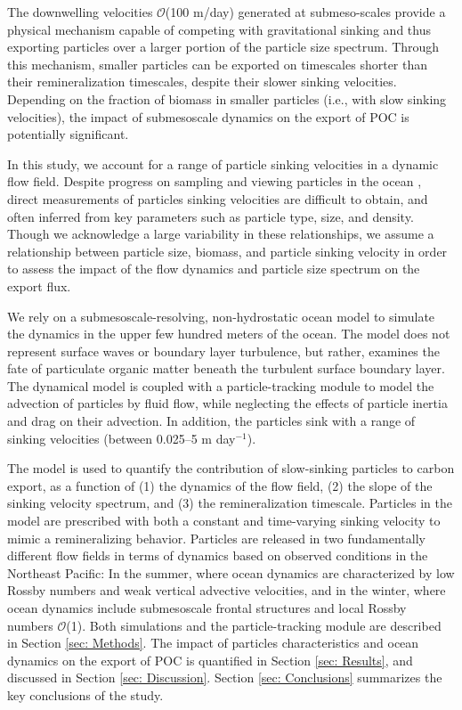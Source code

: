 \documentclass[article,linenumbers]{agujournal2018}
\begin{document}
	The downwelling velocities $\mathcal{O}$(100 m/day) generated at submeso-scales provide a physical mechanism capable of competing with gravitational sinking and thus exporting particles over a larger portion of the particle size spectrum. Through this mechanism, smaller particles can be exported on timescales shorter than their remineralization timescales, despite their slower sinking velocities.   Depending on the fraction of  biomass in smaller particles (i.e., with slow sinking velocities), the impact of submesoscale dynamics on the export of POC is potentially significant.
	
	In this study, we account for a range of particle sinking velocities in a dynamic flow field. Despite progress on sampling and viewing particles in the ocean \citep{McDonnell_2010}, direct measurements of particles sinking velocities are difficult to obtain, and often inferred from key parameters such as particle type, size, and density. Though we acknowledge a large variability in these relationships, we assume a relationship between particle size, biomass, and particle sinking velocity in order to assess the impact of the flow dynamics and particle size spectrum on the export flux. 
	
	We  rely on a submesoscale-resolving, non-hydrostatic ocean model to simulate the dynamics in the upper few hundred meters of the ocean. The model does not represent surface waves or boundary layer turbulence, but rather, examines the fate of particulate organic matter beneath the turbulent surface boundary layer.
	The dynamical model is coupled with a particle-tracking module to model the advection of particles by fluid flow, while neglecting the effects of particle inertia and drag on their advection. In addition, the particles sink with a range of sinking velocities (between 0.025--5 m day$^{-1}$).   
	
	The model is used to quantify the contribution of slow-sinking particles to carbon export, as a function of (1) the dynamics of the flow field, (2) the slope of the sinking velocity spectrum, and (3) the remineralization timescale. Particles in the model are prescribed with both a constant and time-varying sinking velocity to mimic a remineralizing behavior. Particles are released in two fundamentally different flow fields in terms of dynamics based on observed conditions in the Northeast Pacific: In the summer, where ocean dynamics are characterized by low Rossby numbers and weak vertical advective velocities, and in the winter, where ocean dynamics include submesoscale frontal structures and local Rossby numbers $\mathcal{O}$(1). Both simulations and the particle-tracking module are described in Section \ref{sec: Methods}. The impact of particles characteristics and ocean dynamics on the export of POC is quantified in Section \ref{sec: Results}, and discussed in Section \ref{sec: Discussion}. Section \ref{sec: Conclusions} summarizes the key conclusions of the study.
	
\end{document}
